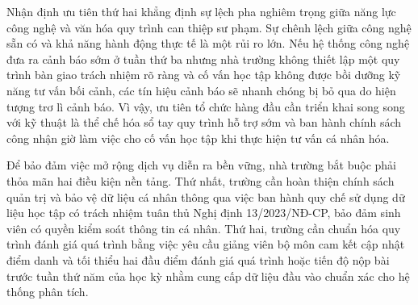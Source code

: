 Nhận định ưu tiên thứ hai khẳng định sự lệch pha nghiêm trọng giữa năng lực công nghệ và văn hóa quy trình can thiệp sư phạm. Sự chênh lệch giữa công nghệ sẵn có và khả năng hành động thực tế là một rủi ro lớn. Nếu hệ thống công nghệ đưa ra cảnh báo sớm ở tuần thứ ba nhưng nhà trường không thiết lập một quy trình bàn giao trách nhiệm rõ ràng và cố vấn học tập không được bồi dưỡng kỹ năng tư vấn bối cảnh, các tín hiệu cảnh báo sẽ nhanh chóng bị bỏ qua do hiện tượng trơ lì cảnh báo. Vì vậy, ưu tiên tổ chức hàng đầu cần triển khai song song với kỹ thuật là thể chế hóa sổ tay quy trình hỗ trợ sớm và ban hành chính sách công nhận giờ làm việc cho cố vấn học tập khi thực hiện tư vấn cá nhân hóa.

Để bảo đảm việc mở rộng dịch vụ diễn ra bền vững, nhà trường bắt buộc phải thỏa mãn hai điều kiện nền tảng. Thứ nhất, trường cần hoàn thiện chính sách quản trị và bảo vệ dữ liệu cá nhân thông qua việc ban hành quy chế sử dụng dữ liệu học tập có trách nhiệm tuân thủ Nghị định 13/2023/NĐ-CP, bảo đảm sinh viên có quyền kiểm soát thông tin cá nhân. Thứ hai, trường cần chuẩn hóa quy trình đánh giá quá trình bằng việc yêu cầu giảng viên bộ môn cam kết cập nhật điểm danh và tối thiểu hai đầu điểm đánh giá quá trình hoặc tiến độ nộp bài trước tuần thứ năm của học kỳ nhằm cung cấp dữ liệu đầu vào chuẩn xác cho hệ thống phân tích.
